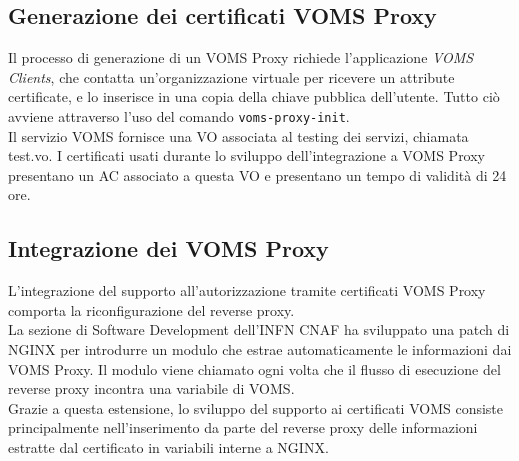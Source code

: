\subsection{Generazione dei certificati VOMS Proxy}
Il processo di generazione di un VOMS Proxy richiede l'applicazione \textit{VOMS Clients}, che contatta un'organizzazione virtuale per ricevere un attribute 
certificate, e lo inserisce in una copia della chiave pubblica dell'utente. Tutto ciò avviene attraverso l'uso del comando \texttt{voms-proxy-init}. 
\\Il servizio VOMS fornisce una VO associata al testing dei servizi, chiamata test.vo. I certificati usati durante lo sviluppo 
dell'integrazione a VOMS Proxy presentano un AC associato a questa VO e presentano un tempo di validità di 24 ore.   

\subsection{Integrazione dei VOMS Proxy}
L'integrazione del supporto all'autorizzazione tramite certificati VOMS Proxy comporta la riconfigurazione del reverse proxy.
\\ La sezione di Software Development dell'INFN CNAF ha sviluppato una patch di NGINX \cite{voms_nginx} per introdurre un modulo che estrae automaticamente le informazioni dai VOMS Proxy.
 Il modulo viene chiamato ogni volta che il flusso di esecuzione del reverse proxy incontra una variabile di VOMS.
\\ Grazie a questa estensione, lo sviluppo del supporto ai certificati VOMS consiste principalmente nell'inserimento da parte del reverse proxy 
delle informazioni estratte dal certificato in variabili interne a NGINX. 


